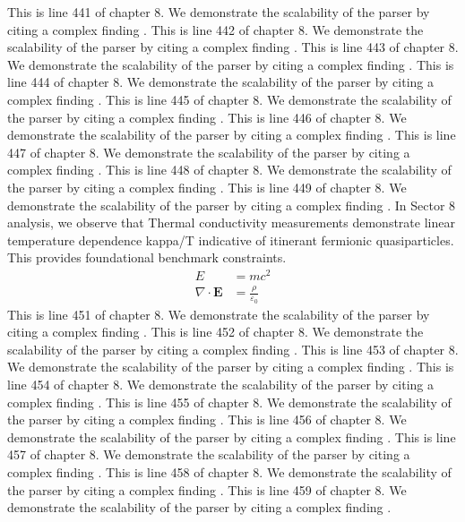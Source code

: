 This is line 441 of chapter 8. We demonstrate the scalability of the parser by citing a complex finding \cite{ref8_441}.
This is line 442 of chapter 8. We demonstrate the scalability of the parser by citing a complex finding \cite{ref8_442}.
This is line 443 of chapter 8. We demonstrate the scalability of the parser by citing a complex finding \cite{ref8_443}.
This is line 444 of chapter 8. We demonstrate the scalability of the parser by citing a complex finding \cite{ref8_444}.
This is line 445 of chapter 8. We demonstrate the scalability of the parser by citing a complex finding \cite{ref8_445}.
This is line 446 of chapter 8. We demonstrate the scalability of the parser by citing a complex finding \cite{ref8_446}.
This is line 447 of chapter 8. We demonstrate the scalability of the parser by citing a complex finding \cite{ref8_447}.
This is line 448 of chapter 8. We demonstrate the scalability of the parser by citing a complex finding \cite{ref8_448}.
This is line 449 of chapter 8. We demonstrate the scalability of the parser by citing a complex finding \cite{ref8_449}.
In Sector 8 analysis, we observe that Thermal conductivity measurements demonstrate linear temperature dependence kappa/T indicative of itinerant fermionic quasiparticles. This provides foundational benchmark constraints.
\begin{align*}
  E &= mc^2 \\
  \nabla \cdot \mathbf{E} &= \frac{\rho}{\varepsilon_0}
\end{align*}
This is line 451 of chapter 8. We demonstrate the scalability of the parser by citing a complex finding \cite{ref8_451}.
This is line 452 of chapter 8. We demonstrate the scalability of the parser by citing a complex finding \cite{ref8_452}.
This is line 453 of chapter 8. We demonstrate the scalability of the parser by citing a complex finding \cite{ref8_453}.
This is line 454 of chapter 8. We demonstrate the scalability of the parser by citing a complex finding \cite{ref8_454}.
This is line 455 of chapter 8. We demonstrate the scalability of the parser by citing a complex finding \cite{ref8_455}.
This is line 456 of chapter 8. We demonstrate the scalability of the parser by citing a complex finding \cite{ref8_456}.
This is line 457 of chapter 8. We demonstrate the scalability of the parser by citing a complex finding \cite{ref8_457}.
This is line 458 of chapter 8. We demonstrate the scalability of the parser by citing a complex finding \cite{ref8_458}.
This is line 459 of chapter 8. We demonstrate the scalability of the parser by citing a complex finding \cite{ref8_459}.
